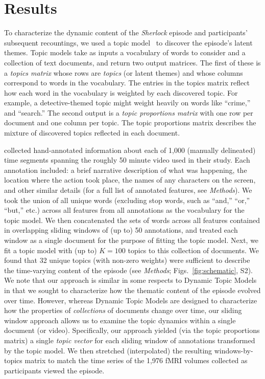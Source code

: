 \documentclass[10pt]{article}
\newcommand{\topics}{S2}
\begin{document}
\section*{Results}
To characterize the dynamic content of the \textit{Sherlock} episode and participants' subsequent recountings, we used a topic model~\citep{BleiEtal03} to discover the episode's latent themes.  Topic models take as inputs a vocabulary of words to consider and a collection of text documents, and return two output matrices.  The first of these is a \textit{topics matrix} whose rows are \textit{topics} (or latent themes) and whose columns correspond to words in the vocabulary. The entries in the topics matrix reflect how each word in the vocabulary is weighted by each discovered topic.  For example, a detective-themed topic might weight heavily on words like ``crime,'' and ``search.''  The second output is a \textit{topic proportions matrix} with one row per document and one column per topic.  The topic proportions matrix describes the mixture of discovered topics reflected in each document.

\cite{ChenEtal17} collected hand-annotated information about each of 1,000 (manually delineated) time segments spanning the roughly 50 minute video used in their study.  Each annotation included: a brief narrative description of what was happening, the location where the action took place, the names of any characters on the screen, and other similar details (for a full list of annotated features, see \textit{Methods}).  We took the union of all unique words (excluding stop words, such as ``and,'' ``or,'' ``but,'' etc.) across all features from all annotations as the vocabulary for the topic model.  We then concatenated the sets of words across all features contained in overlapping sliding windows of (up to) 50 annotations, and treated each window as a single document for the purpose of fitting the topic model.  Next, we fit a topic model with (up to) $K = 100$ topics to this collection of documents.  We found that 32 unique topics (with non-zero weights) were sufficient to describe the time-varying content of the episode (see \textit{Methods}; Figs.~\ref{fig:schematic}, \topics).  We note that our approach is similar in some respects to Dynamic Topic Models~\citep{BleiLaff06} in that we sought to characterize how the thematic content of the episode evolved over time.  However, whereas Dynamic Topic Models are designed to characterize how the properties of \textit{collections} of documents change over time, our sliding window approach allows us to examine the topic dynamics within a single document (or video).  Specifically, our approach yielded (via the topic proportions matrix) a single \textit{topic vector} for each sliding window of annotations transformed by the topic model.  We then stretched (interpolated) the resulting windows-by-topics matrix to match the time series of the 1,976 fMRI volumes collected as participants viewed the episode.
\end{document}
